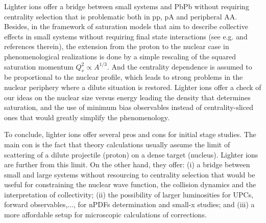 \documentclass[../report.tex]{subfiles}
\begin{document}
Lighter ions offer a bridge between small systems and PbPb without requiring centrality selection that is problematic both in pp, pA and peripheral AA. 
Besides, in the framework of saturation models \cite{Gelis:2010nm} that aim to describe collective effects in small systems without requiring final state interactions (see e.g. \cite{Kovner:2016wsq} and references therein), the extension from the proton to the nuclear case in phenomenological realizations  is done by a simple rescaling of the squared saturation momentum $Q_s^2\propto A^{1/3}$. And the centrality dependence is assumed to be proportional to the nuclear profile, which leads to strong problems in the nuclear periphery where a dilute situation is restored. Lighter ions offer a check of our ideas on the
nuclear size versus energy leading
the density that determines saturation, and the use of minimum bias observables
instead of centrality-sliced ones that
would greatly simplify the phenomenology.

To conclude, lighter ions offer several pros and cons for initial stage studies. The main con is the fact that theory calculations usually assume the limit of scattering of a dilute projectile (proton) on a dense target (nucleus). Lighter ions are further from this limit. On the other hand, they offer: (i) a bridge between small and large systems without resourcing to
centrality selection that would be useful for constraining the nuclear wave function, the
collision dynamics and the interpretation of collectivity;
(ii) the possibility of larger luminosities for UPCs, forward observables,$\dots$,
for nPDFs determination and small-x studies; and (iii)
a more affordable setup for microscopic calculations of corrections.
\end{document}
